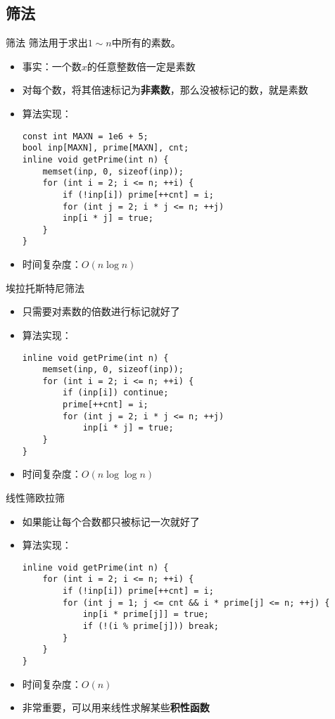 \subsection{筛法}
\begin{frame}[fragile]{筛法}
  筛法用于求出$1\sim n$中所有的素数。
  \begin{itemize}
    \item 事实：一个数$x$的任意整数倍一定是素数
    \pause
    \item 对每个数，将其倍速标记为\textbf{非素数}，那么没被标记的数，就是素数
    \pause
    \item 算法实现：
\begin{lstlisting}
const int MAXN = 1e6 + 5;
bool inp[MAXN], prime[MAXN], cnt;
inline void getPrime(int n) {
    memset(inp, 0, sizeof(inp));
    for (int i = 2; i <= n; ++i) {
        if (!inp[i]) prime[++cnt] = i;
        for (int j = 2; i * j <= n; ++j)
        inp[i * j] = true;
    }
}
\end{lstlisting}
  \item 时间复杂度：$O(n\log{n})$
  \end{itemize}
\end{frame}

\begin{frame}[fragile]{埃拉托斯特尼筛法}
  \begin{itemize}
    \item 只需要对素数的倍数进行标记就好了
    \pause
    \item 算法实现：
\begin{lstlisting}
inline void getPrime(int n) {
    memset(inp, 0, sizeof(inp));
    for (int i = 2; i <= n; ++i) {
        if (inp[i]) continue; 
        prime[++cnt] = i;
        for (int j = 2; i * j <= n; ++j)
            inp[i * j] = true;
    }
}
\end{lstlisting}
    \item 时间复杂度：$O(n\log{\log{n}})$
  \end{itemize}
\end{frame}


\begin{frame}[fragile]{线性筛}{欧拉筛}
  \begin{itemize}
    \item 如果能让每个合数都只被标记一次就好了
    \pause
    \item 算法实现：
\begin{lstlisting}
inline void getPrime(int n) {
    for (int i = 2; i <= n; ++i) {
        if (!inp[i]) prime[++cnt] = i;
        for (int j = 1; j <= cnt && i * prime[j] <= n; ++j) {
            inp[i * prime[j]] = true;
            if (!(i % prime[j])) break;
        }
    }
}
\end{lstlisting}
    \pause
    \item 时间复杂度：$O(n)$
    \item 非常重要，可以用来线性求解某些\textbf{积性函数}
  \end{itemize}
\end{frame}